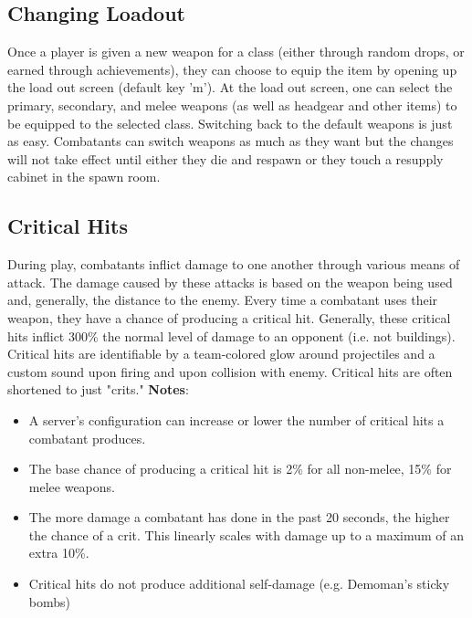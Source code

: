 \subsection{Changing Loadout}
Once a player is given a new weapon for a class (either through random drops, or earned through achievements), they can choose to equip the item by opening up the load out screen (default key 'm'). At the load out screen, one can select the primary, secondary, and melee weapons (as well as headgear and other items) to be equipped to the selected class.  Switching back to the default weapons is just as easy. Combatants can switch weapons as much as they want but the changes will not take effect until either they die and respawn or they touch a resupply cabinet in the spawn room.

\subsection{Critical Hits}
During play, combatants inflict damage to one another through various means of attack.  The damage caused by these attacks is based on the weapon being used and, generally, the distance to the enemy.  Every time a combatant uses their weapon, they have a chance of producing a critical hit.  Generally, these critical hits inflict 300\% the normal level of damage to an opponent (i.e. not buildings). Critical hits are identifiable by a team-colored glow around projectiles and a custom sound upon firing and upon collision with enemy.  Critical hits are often shortened to just "crits."
\newpage
{\bf Notes}:
\begin{itemize}
	\item A server's configuration can increase or lower the number of critical hits a combatant produces. 
	\item The base chance of producing a critical hit is 2\% for all non-melee, 15\% for melee weapons.
	\item The more damage a combatant has done in the past 20 seconds, the higher the chance of a crit. This linearly scales with damage up to a maximum of an extra 10\%. 
	\item Critical hits do not produce additional self-damage (e.g. Demoman's sticky bombs)
\end{itemize}

